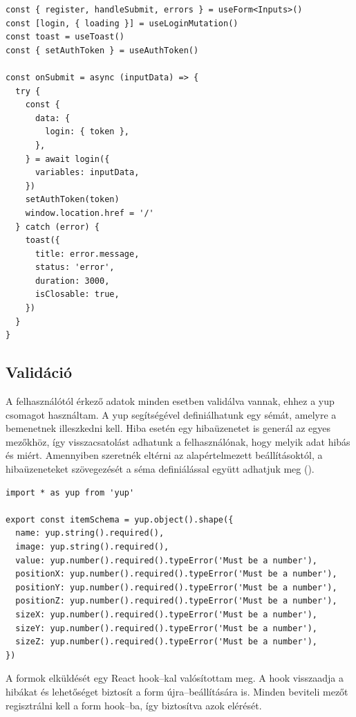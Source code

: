 \begin{lstlisting}[style=ES6, caption={Bejelentkezés kódrészlet},label={lst:loginForm}]
const { register, handleSubmit, errors } = useForm<Inputs>()
const [login, { loading }] = useLoginMutation()
const toast = useToast()
const { setAuthToken } = useAuthToken()

const onSubmit = async (inputData) => {
  try {
    const {
      data: {
        login: { token },
      },
    } = await login({
      variables: inputData,
    })
    setAuthToken(token)
    window.location.href = '/'
  } catch (error) {
    toast({
      title: error.message,
      status: 'error',
      duration: 3000,
      isClosable: true,
    })
  }
}
\end{lstlisting}

\subsection{Validáció}
A felhasználótól érkező adatok minden esetben validálva vannak, ehhez a yup csomagot használtam.
A yup segítségével definiálhatunk egy sémát, amelyre a bemenetnek illeszkedni kell. 
Hiba esetén egy hibaüzenetet is generál az egyes mezőkhöz, így visszacsatolást adhatunk a felhasználónak, hogy melyik adat hibás és miért.
Amennyiben szeretnék eltérni az alapértelmezett beállításoktól, a hibaüzeneteket szövegezését a séma definiálással együtt adhatjuk meg ().

\begin{lstlisting}[style=ES6, caption={Esköz validációs séma},label={lst:yup}]
import * as yup from 'yup'

export const itemSchema = yup.object().shape({
  name: yup.string().required(),
  image: yup.string().required(),
  value: yup.number().required().typeError('Must be a number'),
  positionX: yup.number().required().typeError('Must be a number'),
  positionY: yup.number().required().typeError('Must be a number'),
  positionZ: yup.number().required().typeError('Must be a number'),
  sizeX: yup.number().required().typeError('Must be a number'),
  sizeY: yup.number().required().typeError('Must be a number'),
  sizeZ: yup.number().required().typeError('Must be a number'),
})
\end{lstlisting}

A formok elküldését egy React hook–kal valósítottam meg.
A hook visszaadja a hibákat és lehetőséget biztosít a form újra–beállítására is.
Minden beviteli mezőt regisztrálni kell a form hook–ba, így biztosítva azok elérését.

